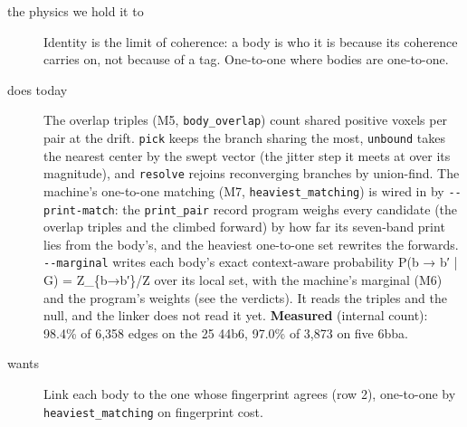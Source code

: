 \begin{description}
\item[{the physics we hold it to}] Identity is the limit of coherence: a body is who it is because its coherence carries on, not because of a tag. One-to-one where bodies are one-to-one.
\item[{does today}] The overlap triples (M5, \texttt{body\_\allowbreak{}overlap}) count shared positive voxels per pair at the drift. \texttt{pick} keeps the branch sharing the most, \texttt{unbound} takes the nearest center by the swept vector (the jitter step it meets at over its magnitude), and \texttt{resolve} rejoins reconverging branches by union-find. The machine's one-to-one matching (M7, \texttt{heaviest\_\allowbreak{}matching}) is wired in by \texttt{-\allowbreak{}-\allowbreak{}print-\allowbreak{}match}: the \texttt{print\_\allowbreak{}pair} record program weighs every candidate (the overlap triples and the climbed forward) by how far its seven-band print lies from the body's, and the heaviest one-to-one set rewrites the forwards. \texttt{-\allowbreak{}-\allowbreak{}marginal} writes each body's exact context-aware probability P(b → b′ | G) = Z\_\allowbreak{}\{b→b′\}/Z over its local set, with the machine's marginal (M6) and the program's weights (see the verdicts). It reads the triples and the null, and the linker does not read it yet. \textbf{Measured} (internal count): 98.4\% of 6,358 edges on the 25 44b6, 97.0\% of 3,873 on five 6bba.
\item[{wants}] Link each body to the one whose fingerprint agrees (row 2), one-to-one by \texttt{heaviest\_\allowbreak{}matching} on fingerprint cost.

\end{description}

